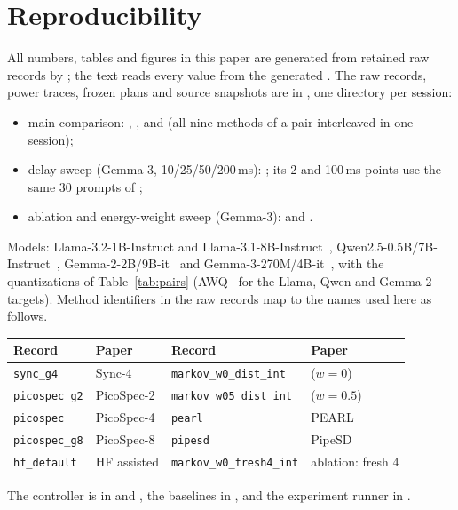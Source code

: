 \section{Reproducibility}
\label{app:repro}
All numbers, tables and figures in this paper are generated from retained raw records by ; the text reads every value from the generated . The raw records, power traces, frozen plans and source snapshots are in , one directory per session:
\begin{itemize}
\item main comparison: , ,  and  (all nine methods of a pair interleaved in one session);
\item delay sweep (Gemma-3, 10/25/50/200\,ms): ; its 2 and 100\,ms points use the same 30 prompts of ;
\item ablation and energy-weight sweep (Gemma-3):  and .
\end{itemize}
Models: Llama-3.2-1B-Instruct and Llama-3.1-8B-Instruct~\cite{llama3}, Qwen2.5-0.5B/7B-Instruct~\cite{qwen25}, Gemma-2-2B/9B-it~\cite{gemma2} and Gemma-3-270M/4B-it~\cite{gemma3}, with the quantizations of Table~\ref{tab:pairs} (AWQ~\cite{awq2024} for the Llama, Qwen and Gemma-2 targets). Method identifiers in the raw records map to the names used here as follows.
\begin{center}\footnotesize
\begin{tabular}{@{}ll@{\qquad}ll@{}}
\toprule
Record & Paper & Record & Paper\\
\midrule
\texttt{sync\_g4} & Sync-4 & \texttt{markov\_w0\_dist\_int} & \capes{} ($w=0$)\\
\texttt{picospec\_g2} & PicoSpec-2 & \texttt{markov\_w05\_dist\_int} & \capee{} ($w=0.5$)\\
\texttt{picospec} & PicoSpec-4 & \texttt{pearl} & PEARL\\
\texttt{picospec\_g8} & PicoSpec-8 & \texttt{pipesd} & PipeSD\\
\texttt{hf\_default} & HF assisted & \texttt{markov\_w0\_fresh4\_int} & ablation: fresh 4\\
\bottomrule
\end{tabular}
\end{center}
The controller is in  and , the baselines in , and the experiment runner in .
